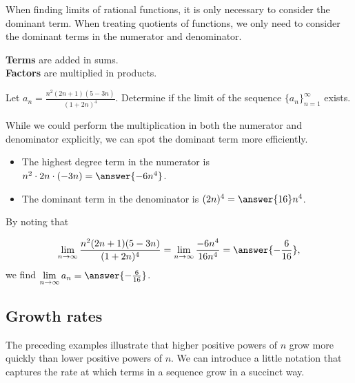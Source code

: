 \documentclass{ximera}
\begin{document}
\begin{remark}
When finding limits of rational functions, it is only necessary to consider the dominant term.  When treating quotients of functions, we only need to consider the dominant terms in the numerator and denominator.
\end{remark}

\begin{remark}
\textbf{\textcolor{purple!85!blue}{Terms}} are added in sums. \\
\textbf{\textcolor{purple!85!blue}{Factors}} are multiplied in products. 
\end{remark}



\begin{example}
Let $a_n = \frac{n^2(2n+1)(5-3n)}{(1+2n)^4}$.  Determine if the limit of the sequence $\{a_n\}_{n=1}^{\infty}$ exists.

\begin{explanation}
While we could perform the multiplication in both the numerator and denominator explicitly, we can spot the dominant term more efficiently.  
\begin{itemize}
\item The highest degree term in the numerator is $n^2 \cdot 2n \cdot (-3n) = \answer{-6n^4}$.
\item The dominant term in the denominator is $(2n)^4 = \answer{16}n^4$.  
\end{itemize}

By noting that 

\[ \lim_{n \to \infty} \frac{n^2(2n+1)(5-3n)}{(1+2n)^4} = \lim_{n \to \infty} \frac{-6n^4}{16n^4} = \answer{-\frac{6}{16}}, \]
we find $\lim\limits_{n \to \infty} a_n = \answer{-\frac{6}{16}}$.
\end{explanation}
\end{example}
 











\subsection*{Growth rates}
The preceding examples illustrate that higher positive powers of $n$ grow more quickly than lower positive powers of $n$.  We can introduce a little notation that captures the rate at which terms in a sequence grow in a succinct way.
\end{document}
